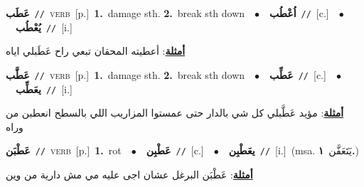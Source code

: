 \documentclass[10pt,a4paper,twoside]{article} %
\begin{document}
\begin{multicols}{2}
{\setlength\topsep{0pt}\textbf{\foreignlanguage{arabic}{عَطَب}}\ {\color{gray}\texttt{//}\color{black}}\ \textsc{verb}\ [p.]\ \textbf{1.}~damage sth.  \textbf{2.}~break sth down\ \ $\bullet$\ \ \setlength\topsep{0pt}\textbf{\foreignlanguage{arabic}{اُعْطُب}}\ {\color{gray}\texttt{//}\color{black}}\ [c.]\ \ $\bullet$\ \ \setlength\topsep{0pt}\textbf{\foreignlanguage{arabic}{يُعْطُب}}\ {\color{gray}\texttt{//}\color{black}}\ [i.]\  \begin{flushright}\color{gray}\foreignlanguage{arabic}{\textbf{\underline{\foreignlanguage{arabic}{أمثلة}}}: أعطيته المحقان تبعي راح عَطَبلي اياه}\end{flushright}\color{black}} \vspace{2mm}

{\setlength\topsep{0pt}\textbf{\foreignlanguage{arabic}{عَطَّب}}\ {\color{gray}\texttt{//}\color{black}}\ \textsc{verb}\ [p.]\ \textbf{1.}~damage sth.  \textbf{2.}~break sth down\ \ $\bullet$\ \ \setlength\topsep{0pt}\textbf{\foreignlanguage{arabic}{عَطِّب}}\ {\color{gray}\texttt{//}\color{black}}\ [c.]\ \ $\bullet$\ \ \setlength\topsep{0pt}\textbf{\foreignlanguage{arabic}{يعَطِّب}}\ {\color{gray}\texttt{//}\color{black}}\ [i.]\  \begin{flushright}\color{gray}\foreignlanguage{arabic}{\textbf{\underline{\foreignlanguage{arabic}{أمثلة}}}: مؤيد عَطَّبلي كل شي بالدار حتى عمستوا المزاريب اللي بالسطح انعطبن من وراه}\end{flushright}\color{black}} \vspace{2mm}

{\setlength\topsep{0pt}\textbf{\foreignlanguage{arabic}{عَطْبَن}}\ {\color{gray}\texttt{//}\color{black}}\ \textsc{verb}\ [p.]\ \textbf{1.}~rot\ \ $\bullet$\ \ \setlength\topsep{0pt}\textbf{\foreignlanguage{arabic}{عَطْبِن}}\ {\color{gray}\texttt{//}\color{black}}\ [c.]\ \ $\bullet$\ \ \setlength\topsep{0pt}\textbf{\foreignlanguage{arabic}{يعَطْبِن}}\ {\color{gray}\texttt{//}\color{black}}\ [i.]\ \color{gray}(msa. \foreignlanguage{arabic}{يَتَعَفَّن}~\foreignlanguage{arabic}{\textbf{١.}})\color{black}\  \begin{flushright}\color{gray}\foreignlanguage{arabic}{\textbf{\underline{\foreignlanguage{arabic}{أمثلة}}}: عَطْبَن البرغل عشان اجى عليه مي مش دارية من وين}\end{flushright}\color{black}} \vspace{2mm}


\end{multicols}
\end{document}
